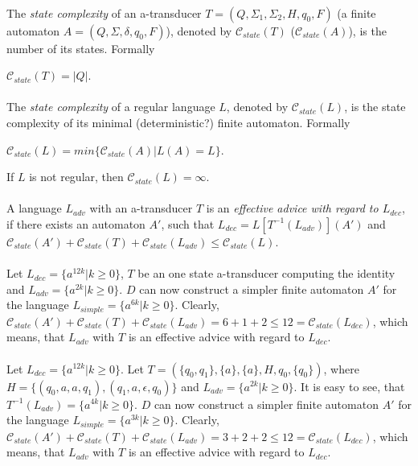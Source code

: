 \documentclass[12pt,oneside,a4paper]{book}
\begin{document}
\paragraph{}
 The \emph{state complexity} of an a-transducer $T = (Q, \Sigma_1, \Sigma_2, H, q_0, F)$ (a finite automaton $A = (Q, \Sigma, \delta, q_0, F)$), denoted by $\mathscr{C}_{state}(T)$ ($\mathscr{C}_{state}(A)$), is the number of its states. Formally \\
\centerline{$\mathscr{C}_{state}(T) = |Q|$.}


\paragraph{}
 The \emph{state complexity} of a regular language $L$, denoted by $\mathscr{C}_{state}(L)$, is the state complexity of its minimal (deterministic?) finite automaton. Formally \\
\centerline{$\mathscr{C}_{state}(L) = min\{ \mathscr{C}_{state}(A)|L(A) = L\} $.}

If $L$ is not regular, then $\mathscr{C}_{state}(L) = \infty $.

\paragraph{}
 A language $L_{adv}$ with an a-transducer $T$ is an \emph{effective advice with regard to $L_{dec}$}, if there exists an automaton $A'$, such that $L_{dec} = L[T^{-1}(L_{adv})](A')$ and $\mathscr{C}_{state}(A') + \mathscr{C}_{state}(T) + \mathscr{C}_{state}(L_{adv}) \leq	 \mathscr{C}_{state}(L)$.

\paragraph{}
\cpriklad Let $L_{dec} = \{ a^{12k}| k \geq 0 \} $, $T$ be an one state a-transducer computing the identity and $L_{adv} = \{ a^{2k}| k \geq 0 \}$. $D$ can now construct a simpler finite automaton $A'$ for the language $L_{simple} = \{ a^{6k}| k \geq 0 \}$. Clearly, $\mathscr{C}_{state}(A') + \mathscr{C}_{state}(T) + \mathscr{C}_{state}(L_{adv}) = 6 + 1 + 2 \leq 12 = \mathscr{C}_{state}(L_{dec})$, which means, that $L_{adv}$ with $T$ is an effective advice with regard  to $L_{dec}$.

\paragraph{}
\cpriklad Let $L_{dec} = \{ a^{12k}| k \geq 0 \} $. Let $T= (\{q_0, q_1\}, \{a\}, \{a\}, H, q_0, \{q_0\})$, where $H = \{(q_0, a, a, q_1), (q_1, a, \epsilon, q_0)\}$ and $L_{adv} = \{ a^{2k}| k \geq 0 \}$. It is easy to see, that $T^{-1}(L_{adv}) = \{ a^{4k}| k \geq 0 \}$. $D$ can now construct a simpler finite automaton $A'$ for the language $L_{simple} = \{ a^{3k}| k \geq 0 \}$. Clearly, $\mathscr{C}_{state}(A') + \mathscr{C}_{state}(T) + \mathscr{C}_{state}(L_{adv}) = 3 + 2 + 2 \leq 12 = \mathscr{C}_{state}(L_{dec})$, which means, that $L_{adv}$ with $T$ is an effective advice with regard  to $L_{dec}$.
\end{document}
